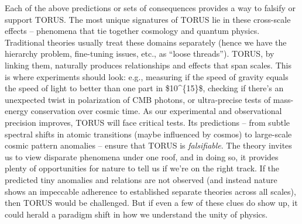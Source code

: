 \documentclass[]{article}
\begin{document}
Each of the above predictions or sets of consequences provides a way to
falsify or support TORUS. The most unique signatures of TORUS lie in
these cross-scale effects -- phenomena that tie together cosmology and
quantum physics. Traditional theories usually treat these domains
separately (hence we have the hierarchy problem, fine-tuning issues,
etc., as ``loose threads''). TORUS, by linking them, naturally produces
relationships and effects that span scales. This is where experiments
should look: e.g., measuring if the speed of gravity equals the speed of
light to better than one part in \$10\^{}\{15\}\$, checking if there's
an unexpected twist in polarization of CMB photons, or ultra-precise
tests of mass-energy conservation over cosmic time. As our experimental
and observational precision improves, TORUS will face critical tests.
Its predictions -- from subtle spectral shifts in atomic transitions
(maybe influenced by cosmos) to large-scale cosmic pattern anomalies --
ensure that TORUS is \emph{falsifiable}. The theory invites us to view
disparate phenomena under one roof, and in doing so, it provides plenty
of opportunities for nature to tell us if we're on the right track. If
the predicted tiny anomalies and relations are not observed (and instead
nature shows an impeccable adherence to established separate theories
across all scales), then TORUS would be challenged. But if even a few of
these clues do show up, it could herald a paradigm shift in how we
understand the unity of physics.
\end{document}
